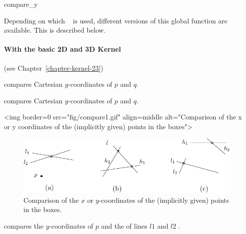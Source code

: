 \begin{ccRefFunction}{compare_y}

Depending on which \cgal\  is used,
different versions of this global function are available. This is
described below.

\paragraph{With the basic 2D and 3D Kernel} (see Chapter~\ref{chapter-kernel-23})

        {compares Cartesian $y$-coordinates of $p$ and $q$.}

        {compares Cartesian $y$-coordinates of $p$ and $q$.}

\begin{ccHtmlOnly}
<img border=0 src="fig/compare1.gif" align=middle alt="Comparison of the x 
or y coordinates of the (implicitly given) points in the boxes">
\end{ccHtmlOnly} 

\begin{ccTexOnly}
\begin{figure}[hb]
\centerline{\includegraphics{Kernel_23_ref/fig/compare1}}
\caption{Comparison of the $x$ or $y$-coordinates of the (implicitly
given) points in the boxes.\label{fig-compare13}}
\end{figure} 
\end{ccTexOnly} 

        {compares the $y$-coordinates of $p$ and the  of lines
         $l1$ and $l2$%
         .}



\end{ccRefFunction}
